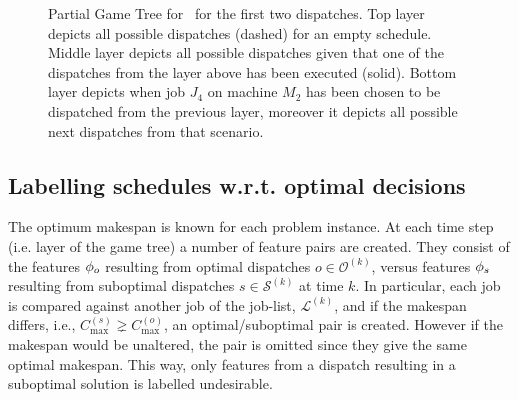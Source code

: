 \begin{figure}
	\caption[Partial Game Tree for \jsp]{Partial Game Tree for \jsp\ for the 
	first two dispatches. 
		Top layer depicts all possible dispatches (dashed) for an empty schedule. 
		Middle layer depicts all possible dispatches given that one of the dispatches from the layer above has been executed (solid). 
	Bottom layer depicts when job $J_4$ on machine $M_2$ has been chosen to be dispatched from the previous layer, moreover it depicts all possible next dispatches from that scenario.}
	\label{fig:jssp:gametree}
\end{figure}

\subsection{Labelling schedules w.r.t. optimal decisions}\label{sec:gentrdat:labelling}
The optimum makespan is known for each problem instance. 
At each time step (i.e. layer of the game tree) a number of feature pairs are created. 
They consist of the features ${\mathbf{\phi}}_o$ resulting from optimal dispatches $o\in\mathcal{O}^{(k)}$, versus features ${\mathbf{\phi}}_s$ resulting from suboptimal dispatches $s\in\mathcal{S}^{(k)}$ at time $k$. 
In particular, each job is compared against another job of the job-list, 
$\mathcal{L}^{(k)}$, and if the makespan differs, i.e., $C_{\max}^{(s)}\gneq 
C_{\max}^{(o)}$, an optimal/suboptimal pair is created. 
However if the makespan would be unaltered, the pair is omitted since they give the same optimal makespan. 
This way, only features from a dispatch resulting in a suboptimal solution is labelled undesirable.

